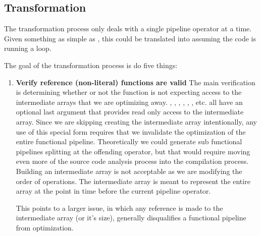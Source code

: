 \subsection{Transformation}\label{Transformation}

The transformation process only deals with a single pipeline operator at a time.  Given something as simple as , this could be translated into  assuming the code is running a  loop.

The goal of the transformation process is do five things:
\begin{enumerate}
  \item \textbf{Verify reference (non-literal) functions are valid}
    The main verification is determining whether or not the function is not expecting access to the intermediate arrays that we are optimizing away.  , , , , , , etc.  all have an optional last argument that provides read only access to the intermediate array.  Since we are skipping creating the intermediate array intentionally, any use of this special form requires that we invalidate the optimization of the entire functional pipeline. Theoretically we could generate sub functional pipelines splitting at the offending operator, but that would require moving even more of the source code analysis process into the compilation process.  Building an intermediate array is not acceptable as we are modifying the order of operations.  The intermediate array is meant to represent the entire array at the point in time before the current pipeline operator.  

    This points to a larger issue, in which any reference is made to the intermediate array (or it's size), generally disqualifies a functional pipeline from optimization.
  

\end{enumerate}
